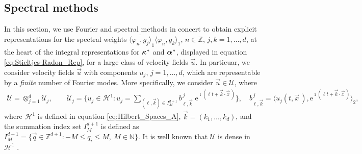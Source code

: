 \documentclass[11pt]{amsart}
\newcommand{\e}{\mathrm{e}}
\newcommand{\Hc}{\mathcal{H}}
\newcommand{\Uc}{\mathcal{U}}
\newcommand\balpha{\mbox{\boldmath${\alpha}$}}
\newcommand\bkappa{\mbox{\boldmath${\kappa}$}}
\begin{document}
\subsection{Spectral methods}
\label{sec:Spectral_Fourier_Methods}
%
In this section, we use Fourier and spectral methods in concert to
obtain explicit representations for the spectral weights
$\overline{\langle\varphi_n,g_j\rangle}_1\langle\varphi_n,g_k\rangle_1$, $n\in\mathbb{Z}$, $j,k=1,\ldots,d$, at
the heart of the integral representations for $\bkappa^*$ and
$\balpha^*$, displayed in equation \eqref{eq:Stieltjes-Radon_Rep}, for
a large class of velocity fields $\vec{u}$. In particuar, we consider
velocity fields $\vec{u}$ with components $u_j$, $j=1,\ldots,d$, which are
representable by a \emph{finite} number of Fourier modes. More
specifically, we consider $\vec{u}\in\Uc$, where 
%
\begin{align}\label{eq:velocity_field_space}
  \Uc=\otimes_{j=1}^d\Uc_j, \qquad
  \Uc_j=\Big\{u_j\in\Hc^1:u_j=\sum_{(\ell,\vec{k})\in I_M^{d+1}}b^{\,j}_{\ell,\vec{k}}\;\e^{\imath(\ell t+\vec{k}\cdot\vec{x}\,)}\Big\},
   \quad
  b^{\,j}_{\ell,\vec{k}}=\big\langle u_j(t,\vec{x}\,),\e^{\imath(\ell t+\vec{k}\cdot\vec{x}\,)}\big\rangle_2, 
\end{align}
%
where $\Hc^1$ is defined in equation \eqref{eq:Hilbert_Spaces_A},
$\vec{k}=(k_1,\ldots,k_d)$, and the summation index set $I_M^{d+1}$ is defined as
$I_M^{d+1}=\{\vec{q}\in\mathbb{Z}^{d+1}:-M\leq q_i\leq M, \ M\in\mathbb{N}\}$. It is well
known that $\Uc$ is dense in $\Hc^1$ \cite{Folland:99}. 
\end{document}
